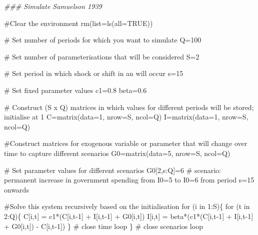 \documentclass[
  letterpaper,
  DIV=11,
  numbers=noendperiod]{scrreprt}
\newenvironment{Shaded}{\begin{snugshade}}{\end{snugshade}}
\newcommand{\AttributeTok}[1]{\textcolor[rgb]{0.40,0.45,0.13}{#1}}
\newcommand{\CommentTok}[1]{\textcolor[rgb]{0.37,0.37,0.37}{#1}}
\newcommand{\ConstantTok}[1]{\textcolor[rgb]{0.56,0.35,0.01}{#1}}
\newcommand{\ControlFlowTok}[1]{\textcolor[rgb]{0.00,0.23,0.31}{#1}}
\newcommand{\DecValTok}[1]{\textcolor[rgb]{0.68,0.00,0.00}{#1}}
\newcommand{\DocumentationTok}[1]{\textcolor[rgb]{0.37,0.37,0.37}{\textit{#1}}}
\newcommand{\FloatTok}[1]{\textcolor[rgb]{0.68,0.00,0.00}{#1}}
\newcommand{\FunctionTok}[1]{\textcolor[rgb]{0.28,0.35,0.67}{#1}}
\newcommand{\NormalTok}[1]{\textcolor[rgb]{0.00,0.23,0.31}{#1}}
\newcommand{\OtherTok}[1]{\textcolor[rgb]{0.00,0.23,0.31}{#1}}
\newcommand{\SpecialCharTok}[1]{\textcolor[rgb]{0.37,0.37,0.37}{#1}}
\begin{document}
\begin{Shaded}
\begin{Highlighting}[]
\DocumentationTok{\#\#\# Simulate Samuelson 1939}

\CommentTok{\#Clear the environment }
\FunctionTok{rm}\NormalTok{(}\AttributeTok{list=}\FunctionTok{ls}\NormalTok{(}\AttributeTok{all=}\ConstantTok{TRUE}\NormalTok{))}

\CommentTok{\# Set number of periods for which you want to simulate}
\NormalTok{Q}\OtherTok{=}\DecValTok{100}

\CommentTok{\# Set number of parameterisations that will be considered}
\NormalTok{S}\OtherTok{=}\DecValTok{2}

\CommentTok{\# Set period in which shock or shift in an will occur}
\NormalTok{s}\OtherTok{=}\DecValTok{15}

\CommentTok{\# Set fixed parameter values}
\NormalTok{c1}\OtherTok{=}\FloatTok{0.8}
\NormalTok{beta}\OtherTok{=}\FloatTok{0.6}

\CommentTok{\# Construct (S x Q) matrices in which values for different periods will be stored; initialise at 1}
\NormalTok{C}\OtherTok{=}\FunctionTok{matrix}\NormalTok{(}\AttributeTok{data=}\DecValTok{1}\NormalTok{, }\AttributeTok{nrow=}\NormalTok{S, }\AttributeTok{ncol=}\NormalTok{Q)}
\NormalTok{I}\OtherTok{=}\FunctionTok{matrix}\NormalTok{(}\AttributeTok{data=}\DecValTok{1}\NormalTok{, }\AttributeTok{nrow=}\NormalTok{S, }\AttributeTok{ncol=}\NormalTok{Q)}

\CommentTok{\#Construct matrices for exogenous variable or parameter that will change over time to capture different scenarios}
\NormalTok{G0}\OtherTok{=}\FunctionTok{matrix}\NormalTok{(}\AttributeTok{data=}\DecValTok{5}\NormalTok{, }\AttributeTok{nrow=}\NormalTok{S, }\AttributeTok{ncol=}\NormalTok{Q)}

\CommentTok{\# Set parameter values for different scenarios}
\NormalTok{G0[}\DecValTok{2}\NormalTok{,s}\SpecialCharTok{:}\NormalTok{Q]}\OtherTok{=}\DecValTok{6}     \CommentTok{\# scenario: permanent increase in government spending from I0=5 to I0=6 from period s=15 onwards}

\CommentTok{\#Solve this system recursively based on the initialisation}
\ControlFlowTok{for}\NormalTok{ (i }\ControlFlowTok{in} \DecValTok{1}\SpecialCharTok{:}\NormalTok{S)\{}
  \ControlFlowTok{for}\NormalTok{ (t }\ControlFlowTok{in} \DecValTok{2}\SpecialCharTok{:}\NormalTok{Q)\{}
\NormalTok{    C[i,t] }\OtherTok{=}\NormalTok{ c1}\SpecialCharTok{*}\NormalTok{(C[i,t}\DecValTok{{-}1}\NormalTok{] }\SpecialCharTok{+}\NormalTok{ I[i,t}\DecValTok{{-}1}\NormalTok{] }\SpecialCharTok{+}\NormalTok{ G0[i,t])}
\NormalTok{    I[i,t] }\OtherTok{=}\NormalTok{ beta}\SpecialCharTok{*}\NormalTok{(c1}\SpecialCharTok{*}\NormalTok{(C[i,t}\DecValTok{{-}1}\NormalTok{] }\SpecialCharTok{+}\NormalTok{ I[i,t}\DecValTok{{-}1}\NormalTok{] }\SpecialCharTok{+}\NormalTok{ G0[i,t]) }\SpecialCharTok{{-}}\NormalTok{ C[i,t}\DecValTok{{-}1}\NormalTok{])}
\NormalTok{  \} }\CommentTok{\# close time loop}
\NormalTok{\}   }\CommentTok{\# close scenarios loop}


\end{Highlighting}
\end{Shaded}
\end{document}
